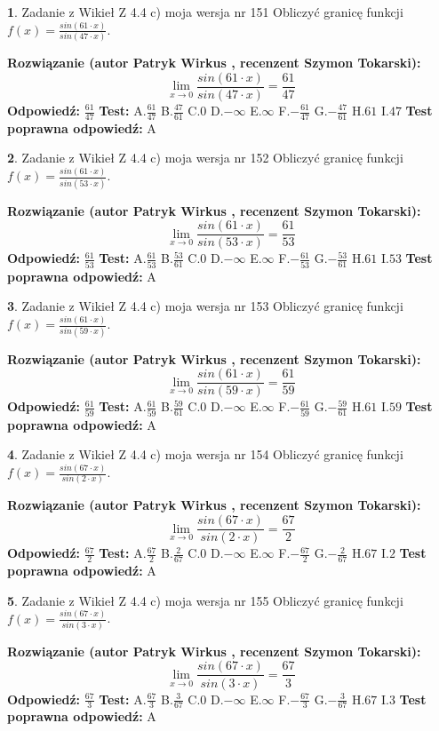 \documentclass[12pt, a4paper]{article}
\theoremstyle{definition} %
\newtheorem{zad}{}
\newcommand{\zadStart}[1]{\begin{zad}#1\newline}
\newcommand{\zadStop}{\end{zad}}
\newcommand{\rozwStart}[2]{\noindent \textbf{Rozwiązanie (autor #1 , recenzent #2): }\newline}
\newcommand{\rozwStop}{\newline}
\newcommand{\odpStart}{\noindent \textbf{Odpowiedź:}\newline}
\newcommand{\odpStop}{\newline}
\newcommand{\testStart}{\noindent \textbf{Test:}\newline}
\newcommand{\testStop}{\newline}
\newcommand{\kluczStart}{\noindent \textbf{Test poprawna odpowiedź:}\newline}
\newcommand{\kluczStop}{\newline}
\begin{document}
\zadStart{Zadanie z Wikieł Z 4.4 c) moja wersja nr 151}
Obliczyć granicę funkcji $f(x)=\frac{sin(61\cdot x)}{sin(47\cdot x)}$.
\zadStop
\rozwStart{Patryk Wirkus}{Szymon Tokarski}
$$\lim\limits_{x\to 0}\frac{sin(61\cdot x)}{sin(47\cdot x)}=
\frac{61}{47}$$
\rozwStop
\odpStart
$\frac{61}{47}$
\odpStop
\testStart
A.$\frac{61}{47}$
B.$\frac{47}{61}$
C.$0$
D.$-\infty$
E.$\infty$
F.$-\frac{61}{47}$
G.$-\frac{47}{61}$
H.$61$
I.$47$
\testStop
\kluczStart
A
\kluczStop



\zadStart{Zadanie z Wikieł Z 4.4 c) moja wersja nr 152}
Obliczyć granicę funkcji $f(x)=\frac{sin(61\cdot x)}{sin(53\cdot x)}$.
\zadStop
\rozwStart{Patryk Wirkus}{Szymon Tokarski}
$$\lim\limits_{x\to 0}\frac{sin(61\cdot x)}{sin(53\cdot x)}=
\frac{61}{53}$$
\rozwStop
\odpStart
$\frac{61}{53}$
\odpStop
\testStart
A.$\frac{61}{53}$
B.$\frac{53}{61}$
C.$0$
D.$-\infty$
E.$\infty$
F.$-\frac{61}{53}$
G.$-\frac{53}{61}$
H.$61$
I.$53$
\testStop
\kluczStart
A
\kluczStop



\zadStart{Zadanie z Wikieł Z 4.4 c) moja wersja nr 153}
Obliczyć granicę funkcji $f(x)=\frac{sin(61\cdot x)}{sin(59\cdot x)}$.
\zadStop
\rozwStart{Patryk Wirkus}{Szymon Tokarski}
$$\lim\limits_{x\to 0}\frac{sin(61\cdot x)}{sin(59\cdot x)}=
\frac{61}{59}$$
\rozwStop
\odpStart
$\frac{61}{59}$
\odpStop
\testStart
A.$\frac{61}{59}$
B.$\frac{59}{61}$
C.$0$
D.$-\infty$
E.$\infty$
F.$-\frac{61}{59}$
G.$-\frac{59}{61}$
H.$61$
I.$59$
\testStop
\kluczStart
A
\kluczStop



\zadStart{Zadanie z Wikieł Z 4.4 c) moja wersja nr 154}
Obliczyć granicę funkcji $f(x)=\frac{sin(67\cdot x)}{sin(2\cdot x)}$.
\zadStop
\rozwStart{Patryk Wirkus}{Szymon Tokarski}
$$\lim\limits_{x\to 0}\frac{sin(67\cdot x)}{sin(2\cdot x)}=
\frac{67}{2}$$
\rozwStop
\odpStart
$\frac{67}{2}$
\odpStop
\testStart
A.$\frac{67}{2}$
B.$\frac{2}{67}$
C.$0$
D.$-\infty$
E.$\infty$
F.$-\frac{67}{2}$
G.$-\frac{2}{67}$
H.$67$
I.$2$
\testStop
\kluczStart
A
\kluczStop



\zadStart{Zadanie z Wikieł Z 4.4 c) moja wersja nr 155}
Obliczyć granicę funkcji $f(x)=\frac{sin(67\cdot x)}{sin(3\cdot x)}$.
\zadStop
\rozwStart{Patryk Wirkus}{Szymon Tokarski}
$$\lim\limits_{x\to 0}\frac{sin(67\cdot x)}{sin(3\cdot x)}=
\frac{67}{3}$$
\rozwStop
\odpStart
$\frac{67}{3}$
\odpStop
\testStart
A.$\frac{67}{3}$
B.$\frac{3}{67}$
C.$0$
D.$-\infty$
E.$\infty$
F.$-\frac{67}{3}$
G.$-\frac{3}{67}$
H.$67$
I.$3$
\testStop
\kluczStart
A
\kluczStop
\end{document}

